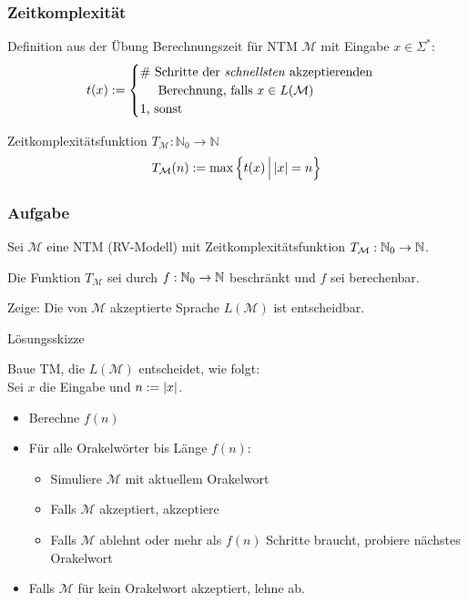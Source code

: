 \begin{frame}

\frametitle{Zeitkomplexität}
\begin{block}{Definition aus der Übung}
    Berechnungszeit für NTM $\mathcal{M}$ mit Eingabe $x \in \Sigma^*$: \\
    $$t(x) := \begin{cases}
                \text{\# Schritte der \emph{schnellsten} akzeptierenden} \\ \hspace{0.5cm}\text{Berechnung, falls  } x \in L(\mathcal{M})\\ 
                1 \text{, sonst}
             \end{cases} $$
 
    Zeitkomplexitätsfunktion $T_\mathcal{M} : \mathbb{N}_0 \rightarrow \mathbb{N}$ \\
    $$T_\mathcal{M}(n) := \text{max}\left\lbrace \vphantom{x^j_j} t(x) \,\middle\vert\, \left\vert x \right\vert = n  \right\rbrace$$

\end{block}

\end{frame}


\begin{frame}
	\frametitle{Aufgabe}
	
	Sei $\mathcal{M}$ eine NTM (RV-Modell) mit Zeitkomplexitätsfunktion $T_\mathcal{M} : \mathbb{N}_0 \rightarrow \mathbb{N}$.
	
	Die Funktion $T_\mathcal{M}$ sei durch $f : \mathbb{N}_0 \rightarrow \mathbb{N}$ beschränkt und $f$ sei berechenbar.
	
	Zeige: Die von $\mathcal{M}$ akzeptierte Sprache $L(\mathcal{M})$ ist entscheidbar.
	
	\invincible \pause
	\begin{block}{Lösungsskizze}
	
	Baue TM, die $L(\mathcal{M})$ entscheidet, wie folgt: \\ Sei $x$ die Eingabe und $n := \left\vert x \right\vert$.
	
	\begin{itemize}
		\item Berechne $f(n)$
		\item Für alle Orakelwörter bis Länge $f(n)$:
		\begin{itemize}
		\item Simuliere $\mathcal{M}$ mit aktuellem Orakelwort
		\item Falls $\mathcal{M}$ akzeptiert, akzeptiere
		\item Falls $\mathcal{M}$ ablehnt oder mehr als $f(n)$ Schritte braucht, probiere nächstes Orakelwort
		\end{itemize}
		\item Falls $\mathcal{M}$ für kein Orakelwort akzeptiert, lehne ab.
	\end{itemize}
	\vincible
	\end{block}
\end{frame}

